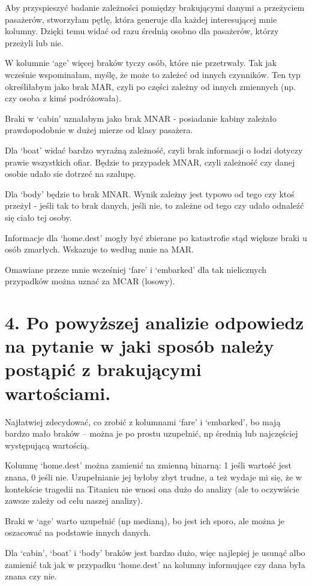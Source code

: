 \documentclass[11pt]{article}
\begin{document}
    Aby przyspieszyć badanie zależności pomiędzy brakującymi danymi a
przeżyciem pasażerów, stworzyłam pętlę, która generuje dla każdej
interesującej mnie kolumny. Dzięki temu widać od razu średnią osobno dla
pasażerów, którzy przeżyli lub nie.

W kolumnie `age' więcej braków tyczy osób, które nie przetrwały. Tak jak
wcześnie wspominałam, myślę, że może to zależeć od innych czynników. Ten
typ określiłabym jako brak MAR, czyli po części zależny od innych
zmiennych (np. czy osoba z kimś podróżowała).

Braki w `cabin' uznałabym jako brak MNAR - posiadanie kabiny zależało
prawdopodobnie w dużej mierze od klasy pasażera.

Dla `boat' widać bardzo wyraźną zależność, czyli brak informacji o łodzi
dotyczy prawie wszystkich ofiar. Będzie to przypadek MNAR, czyli
zależność czy danej osobie udało sie dotrzeć na szalupę.

Dla `body' będzie to brak MNAR. Wynik zależny jest typowo od tego czy
ktoś przeżył - jeśli tak to brak danych, jeśli nie, to zależne od tego
czy udało odnaleźć się ciało tej osoby.

Informacje dla `home.dest' mogły być zbierane po katastrofie stąd
większe braki u osób zmarłych. Wskazuje to według mnie na MAR.

Omawiane przeze mnie wcześniej `fare' i `embarked' dla tak nielicznych
przypadków można uznać za MCAR (losowy).

    \section*{4. Po powyższej analizie odpowiedz na pytanie w jaki
sposób należy postąpić z brakującymi
wartościami.}\label{po-powyux17cszej-analizie-odpowiedz-na-pytanie-w-jaki-sposuxf3b-naleux17cy-postux105piux107-z-brakujux105cymi-wartoux15bciami.}

    Najłatwiej zdecydować, co zrobić z kolumnami `fare' i `embarked', bo
mają bardzo mało braków -- można je po prostu uzupełnić, np średnią lub
najczęściej występującą wartością.

Kolumnę `home.dest' można zamienić na zmienną binarną: 1 jeśli wartość
jest znana, 0 jeśli nie. Uzupełnianie jej byłoby zbyt trudne, a też
wydaje mi się, że w kontekście tragedii na Titanicu nie wnosi ona dużo
do analizy (ale to oczywiście zawsze zależy od celu naszej analizy).

Braki w `age' warto uzupełnić (np medianą), bo jest ich sporo, ale można
je oszacować na podstawie innych danych.

Dla `cabin', `boat' i `body' braków jest bardzo dużo, więc najlepiej je
usunąć albo zamienić tak jak w przypadku `home.dest' na kolumny
informujące czy dana była znana czy nie.


    
    
    
\end{document}
